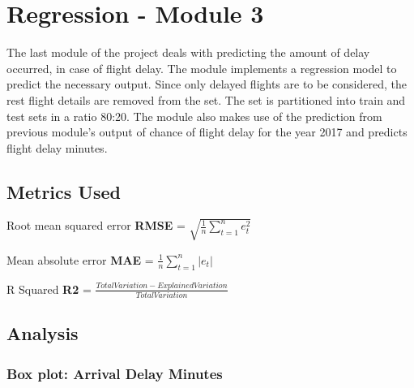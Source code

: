 \documentclass{article}
\begin{document}
\clearpage

\section{Regression - Module 3}

The last module of the project deals with predicting the amount of delay occurred, in case of flight delay. The module implements a regression model to predict the necessary output. Since only delayed flights are to be considered, the rest flight details are removed from the set. The set is partitioned into train and test sets in a ratio 80:20. The module also makes use of the prediction from previous module's output of chance of flight delay for the year 2017 and predicts flight delay minutes.

    
\subsection{Metrics Used}
\begin{center}

Root mean squared error  \textbf{RMSE} = $\displaystyle\sqrt{\frac{1}{n}\sum_{t=1}^{n}e_t^2}$ \\
\bigbreak

Mean absolute error  \textbf{MAE} = $\displaystyle\frac{1}{n}\sum_{t=1}^{n}|e_t|$ \\
\bigbreak


R Squared \textbf{R2} = $\displaystyle\frac{Total Variation-Explained Variation}{Total Variation}$ \\
\end{center}
\bigbreak


\subsection{Analysis}

\subsubsection{Box plot: Arrival Delay Minutes}

\begin{center}
    

\end{center}
\end{document}
